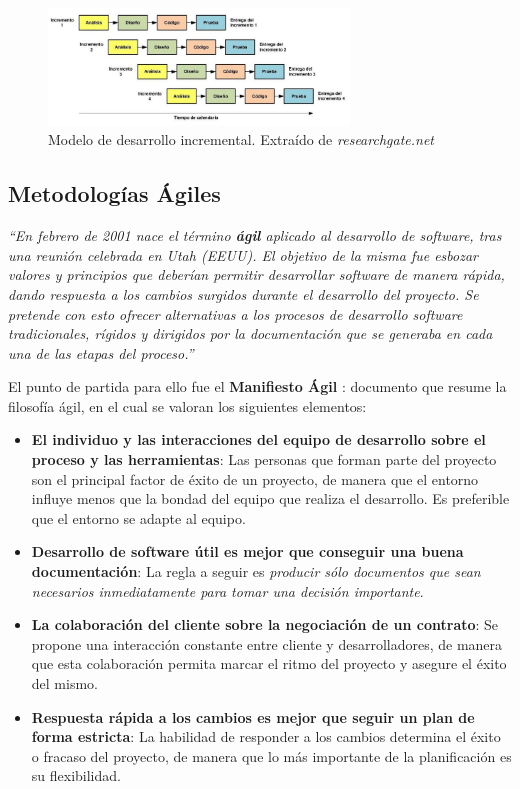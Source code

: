 \begin{itemize}
    \begin{figure}[H]
        \centering
        \includegraphics[width=8cm]{Figures/modelo_incremental.png}
        \caption{Modelo de desarrollo incremental. Extraído de \textit{researchgate.net} \autocite*{Alarcon2016}}
        \label{incremental}
    \end{figure}
\end{itemize}

\subsection{Metodologías Ágiles}
\textit{“En febrero de 2001 nace el término \textbf{ágil} aplicado al desarrollo de software, tras una reunión celebrada en 
\textnormal{Utah (EEUU)}. El objetivo de la misma fue esbozar valores y principios que deberían permitir desarrollar 
software de manera rápida, dando respuesta a los cambios surgidos durante el desarrollo del proyecto. Se pretende 
con esto ofrecer alternativas a los procesos de desarrollo software tradicionales, rígidos y dirigidos por la documentación 
que se generaba en cada una de las etapas del proceso.”} \autocite*{AmayaBalaguera2015} \medskip

El punto de partida para ello fue el \textbf{Manifiesto Ágil} \autocite*{Beck2001}: 
documento que resume la filosofía ágil, en el cual se valoran los siguientes elementos:
\begin{itemize}
    \item \textbf{El individuo y las interacciones del equipo de desarrollo sobre el proceso y las herramientas}:
    Las personas que forman parte del proyecto son el principal factor de éxito de un proyecto, de manera que el entorno
    influye menos que la bondad del equipo que realiza el desarrollo. Es preferible que el entorno se adapte al equipo.

    \item \textbf{Desarrollo de software útil es mejor que conseguir una buena documentación}:
    La regla a seguir es \textit{producir sólo documentos que sean necesarios inmediatamente para tomar una 
    decisión importante}.

    \item \textbf{La colaboración del cliente sobre la negociación de un contrato}: Se propone una interacción 
    constante entre cliente y desarrolladores, de manera que esta colaboración permita marcar el ritmo del 
    proyecto y asegure el éxito del mismo.

    \item \textbf{Respuesta rápida a los cambios es mejor que seguir un plan de forma estricta}:
    La habilidad de responder a los cambios determina el éxito o fracaso del proyecto, de manera que lo
    más importante de la planificación es su flexibilidad.
\end{itemize} 

